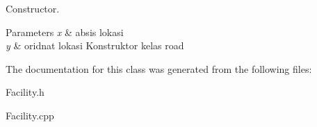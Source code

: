 Constructor. 


\begin{DoxyParams}{Parameters}
{\em x} & absis lokasi \\
\hline
{\em y} & oridnat lokasi Konstruktor kelas road \\
\hline
\end{DoxyParams}


The documentation for this class was generated from the following files\+:\begin{DoxyCompactItemize}
\item 
Facility.\+h\item 
Facility.\+cpp\end{DoxyCompactItemize}
